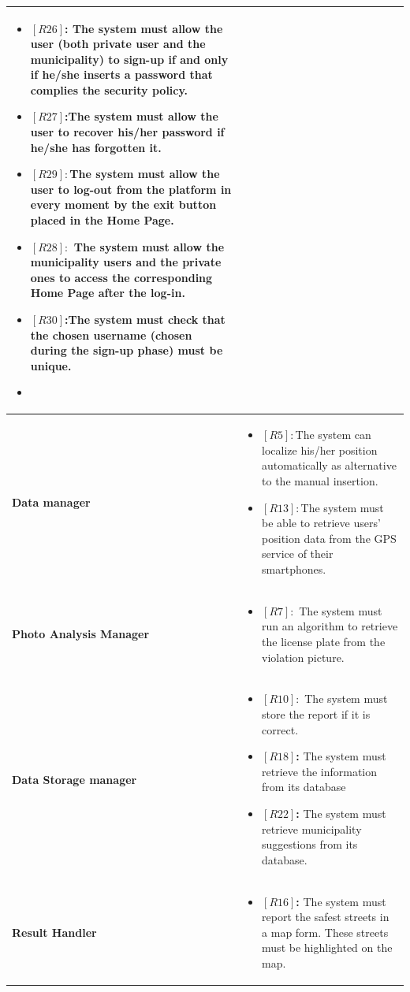 \documentclass[titlepage]{article}
\begin{document}
\begin{longtable}{| p{7 cm} | p{8 cm} |}
\begin{itemize}
			 \item \textbf{$[R26]$:} The system must allow the user (both private user and the municipality) to sign-up if and only if he/she inserts a password that complies the security policy. 
			 \item \textbf{$[R27]$:}The system must allow the user to recover his/her password if he/she has forgotten it. 
			 \item \textbf{$[R29]:$}The system must allow the user to log-out from the platform in every moment by the exit button placed in the Home Page. 
			 \item \textbf{$[R28]:$} The system must allow the municipality users and the private ones to access the corresponding Home Page after the log-in. 
			 \item \textbf{$[R30]$:}The system must check that the chosen username (chosen during the sign-up phase) must be unique. 
			 \item \textbf{}
		\end{itemize} \\ \hline
		\newline \textbf {Data manager} &
		\begin{itemize}
			\item \textbf{$[R5]:$}The system can localize his/her position automatically as alternative to the manual insertion.
			\item \textbf{$[R13]:$}The system must be able to retrieve users' position data from the GPS service of their smartphones. 
		\end{itemize} \\ \hline
		\newline \textbf {Photo Analysis Manager} &
		\begin{itemize}
		\item \textbf{$[R7]:$} The system must run an algorithm to retrieve the license plate from the violation picture. 
		\end{itemize} \\ \hline
		\newline \textbf {Data Storage manager} &
		\begin{itemize}
			\item \textbf{$[R10]:$} The system must store the report if it is correct.
			\item \textbf{$[R18]$:} The system must retrieve the information from its database
			\item \textbf{$[R22]$:} The system must retrieve municipality suggestions from its database. 
		\end{itemize} \\ \hline
		\newline \textbf {Result Handler} &
		\begin{itemize}
			\item \textbf{$[R16]$:} The system must report the safest streets in a map form. These streets must be highlighted on the map. 
		\end{itemize} \\ \hline
\end{longtable}
\end{document}
